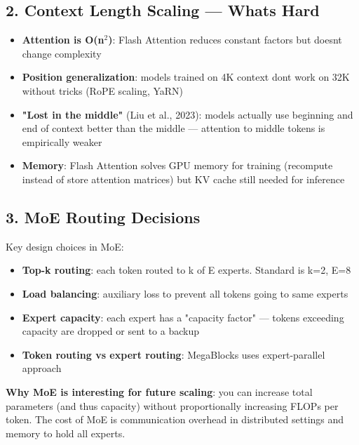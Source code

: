 \documentclass[11pt]{article}
\providecommand{\tightlist}{\setlength{\itemsep}{1pt}\setlength{\parskip}{0pt}}
\begin{document}
\subsection{2. Context Length Scaling --- What\textquotesingle s Hard}\label{2-context-length-scaling--whats-hard}

\begin{itemize}
\tightlist
\item
  \textbf{Attention is O(n\(^2\))}: Flash Attention reduces constant factors but doesn\textquotesingle t change complexity
\item
  \textbf{Position generalization}: models trained on 4K context don\textquotesingle t work on 32K without tricks (RoPE scaling, YaRN)
\item
  \textbf{"Lost in the middle"} (Liu et al., 2023): models actually use beginning and end of context better than the middle --- attention to middle tokens is empirically weaker
\item
  \textbf{Memory}: Flash Attention solves GPU memory for training (recompute instead of store attention matrices) but KV cache still needed for inference
\end{itemize}

\subsection{3. MoE Routing Decisions}\label{3-moe-routing-decisions}

Key design choices in MoE:

\begin{itemize}
\tightlist
\item
  \textbf{Top-k routing}: each token routed to k of E experts. Standard is k=2, E=8
\item
  \textbf{Load balancing}: auxiliary loss to prevent all tokens going to same experts
\item
  \textbf{Expert capacity}: each expert has a "capacity factor" --- tokens exceeding capacity are dropped or sent to a backup
\item
  \textbf{Token routing vs expert routing}: MegaBlocks uses expert-parallel approach
\end{itemize}

\textbf{Why MoE is interesting for future scaling}: you can increase total parameters (and thus capacity) without proportionally increasing FLOPs per token. The cost of MoE is communication overhead in distributed settings and memory to hold all experts.
\end{document}
